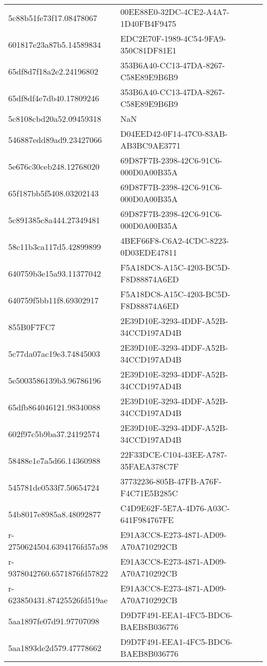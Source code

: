 \begin{tabular}{ll}
5c88b51fe73f17.08478067 & 00EE88E0-32DC-4CE2-A4A7-1D40FB4F9475 \\
601817e23a87b5.14589834 & EDC2E70F-1989-4C54-9FA9-350C81DF81E1 \\
65df8d7f18a2e2.24196802 & 353B6A40-CC13-47DA-8267-C58E89E9B6B9 \\
65df8df4e7db40.17809246 & 353B6A40-CC13-47DA-8267-C58E89E9B6B9 \\
5c8108cbd20a52.09459318 & NaN \\
546887edd89ad9.23427066 & D04EED42-0F14-47C0-83AB-AB3BC9AE3771 \\
5e676c30ceb248.12768020 & 69D87F7B-2398-42C6-91C6-000D0A00B35A \\
65f187bb5f5408.03202143 & 69D87F7B-2398-42C6-91C6-000D0A00B35A \\
5c891385c8a444.27349481 & 69D87F7B-2398-42C6-91C6-000D0A00B35A \\
58c11b3ca117d5.42899899 & 4BEF66F8-C6A2-4CDC-8223-0D03EDE47811 \\
640759b3e15a93.11377042 & F5A18DC8-A15C-4203-BC5D-F8D88874A6ED \\
640759f5bb11f8.69302917 & F5A18DC8-A15C-4203-BC5D-F8D88874A6ED \\
855B0F7FC7 & 2E39D10E-3293-4DDF-A52B-34CCD197AD4B \\
5c77da07ac19e3.74845003 & 2E39D10E-3293-4DDF-A52B-34CCD197AD4B \\
5e5003586139b3.96786196 & 2E39D10E-3293-4DDF-A52B-34CCD197AD4B \\
65dfb864046121.98340088 & 2E39D10E-3293-4DDF-A52B-34CCD197AD4B \\
602f97c5b9ba37.24192574 & 2E39D10E-3293-4DDF-A52B-34CCD197AD4B \\
58488e1e7a5d66.14360988 & 22F33DCE-C104-43EE-A787-35FAEA378C7F \\
545781de0533f7.50654724 & 37732236-805B-47FB-A76F-F4C71E5B285C \\
54b8017e8985a8.48092877 & C4D9E62F-5E7A-4D76-A03C-641F984767FE \\
r-2750624504.6394176fd57a98 & E91A3CC8-E273-4871-AD09-A70A710292CB \\
r-9378042760.6571876fd57822 & E91A3CC8-E273-4871-AD09-A70A710292CB \\
r-623850431.87425526fd519ae & E91A3CC8-E273-4871-AD09-A70A710292CB \\
5aa1897fe07d91.97707098 & D9D7F491-EEA1-4FC5-BDC6-BAEB8B036776 \\
5aa1893de2d579.47778662 & D9D7F491-EEA1-4FC5-BDC6-BAEB8B036776 \\

\end{tabular}
